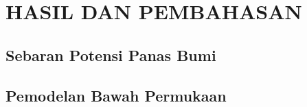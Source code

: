 \chapter{HASIL DAN PEMBAHASAN}
\section{Sebaran Potensi Panas Bumi}
\section{Pemodelan Bawah Permukaan}